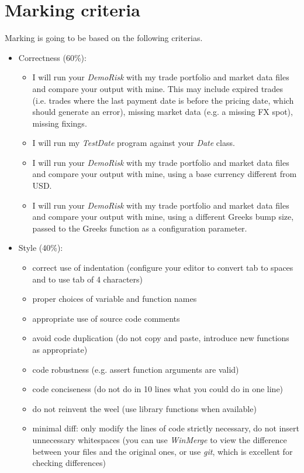\documentclass[10pt]{article}
\begin{document}
\section{Marking criteria}
Marking is going to be based on the following criterias.
\begin{itemize}
\item Correctness (60\%):
\begin{itemize}
\item I will run your \textit{DemoRisk} with my trade portfolio and market data files and compare your output with mine. This may include expired trades (i.e. trades where the last payment date is before the pricing date, which should generate an error), missing market data (e.g. a missing FX spot), missing fixings.
\item I will run my \textit{TestDate} program against your \textit{Date} class.
\item I will run your \textit{DemoRisk} with my trade portfolio and market data files and compare your output with mine, using a base currency different from USD.
\item I will run your \textit{DemoRisk} with my trade portfolio and market data files and compare your output with mine, using a different Greeks bump size, passed to the Greeks function as a configuration parameter.
\end{itemize}
\item Style (40\%):
\begin{itemize}
\item correct use of indentation (configure your editor to convert tab to spaces and to use tab of 4 characters)
\item proper choices of variable and function names
\item appropriate use of source code comments
\item avoid code duplication (do not copy and paste, introduce new functions as appropriate)
\item code robustness (e.g. assert function arguments are valid)
\item code conciseness (do not do in 10 lines what you could do in one line)
\item do not reinvent the weel (use library functions when available)
\item minimal diff: only modify the lines of code strictly necessary, do not insert unnecessary whitespaces (you can use \textit{WinMerge} to view the difference between your files and the original ones, or use \textit{git}, which is excellent for checking differences)
\end{itemize}
\end{itemize}
\end{document}
